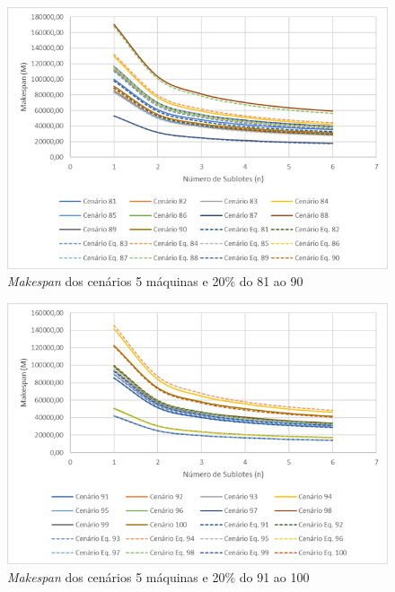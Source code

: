 \begin{figure}[H]
    \centering
    \includegraphics[width=13cm]{Apendices/Figuras/05m20_81-90}
    \caption{\textit{Makespan} dos cenários 5 máquinas e 20\% do 81 ao 90}
    \label{fig:05m20_81-90}
\end{figure}

\begin{figure}[H]
    \centering
    \includegraphics[width=13cm]{Apendices/Figuras/05m20_91-100}
    \caption{\textit{Makespan} dos cenários 5 máquinas e 20\% do 91 ao 100}
    \label{fig:05m20_91-100}
\end{figure}